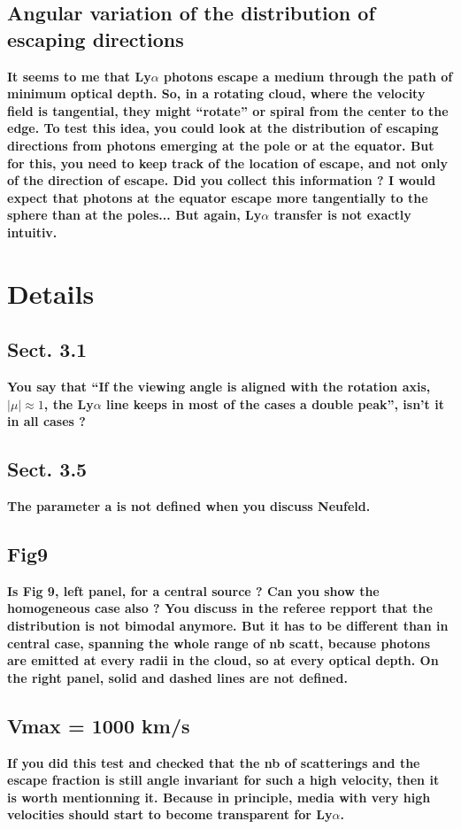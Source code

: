 \documentclass[12pt]{article}
\begin{document}
\subsection*{Angular variation of the distribution of escaping directions}

{\bf It seems to me that Ly$\alpha$ photons escape a medium through the path of minimum optical depth. So, in a rotating cloud, where the velocity field is tangential, they might “rotate” or spiral from the center to the edge. To test this idea, you could look at the distribution of escaping directions from photons emerging at the pole or at the equator. But for this, you need to keep track of the location of escape, and not only of the direction of escape. Did you collect this information ?
I would expect that photons at the equator escape more tangentially to the sphere than at the poles... But again, Ly$\alpha$ transfer is not exactly intuitiv.}


\section*{Details}

\subsection*{Sect. 3.1}

{\bf You say that “If the viewing angle is aligned with the rotation axis, $|\mu| \approx 1$, the Ly$\alpha$ line keeps in most of the cases a double peak”, isn’t it in all cases ?}

\subsection*{Sect. 3.5}
{\bf The parameter a is not defined when you discuss Neufeld.} 

\subsection*{Fig9}

{\bf Is Fig 9, left panel, for a central source ? Can you show the homogeneous case also ? You discuss in the referee repport that the distribution is not bimodal anymore. But it has to be different than in central case, spanning the whole range of nb scatt, because photons are emitted at every radii in the cloud, so at every optical depth.
On the right panel, solid and dashed lines are not defined.} 

\subsection*{Vmax = 1000 km/s}
{\bf If you did this test and checked that the nb of scatterings and the escape fraction is still angle invariant for such a high velocity, then it is worth mentionning it. Because in principle, media with very high velocities should start to become transparent for Ly$\alpha$.} 
\end{document}
